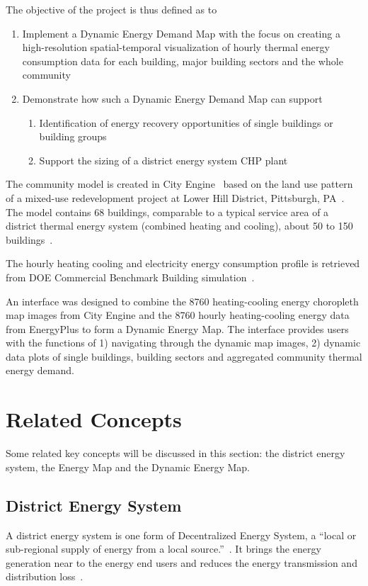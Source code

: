 The objective of the project is thus defined as to 
\begin{enumerate}
\item Implement a Dynamic Energy Demand Map with the focus on creating
  a high-resolution spatial-temporal visualization of hourly thermal
  energy consumption data for each building, major building sectors
  and the whole community
\item Demonstrate how such a Dynamic Energy Demand Map can support
  \begin{enumerate}
  \item Identification of energy recovery opportunities of single
    buildings or building groups
  \item Support the sizing of a district energy system CHP plant
  \end{enumerate}
\end{enumerate}

The community model is created in City Engine~\cite{cityEngine2015}
based on the land use pattern of a mixed-use redevelopment project at
Lower Hill District, Pittsburgh, PA~\cite{Ramesh2013}. The model
contains 68 buildings, comparable to a typical service area of a
district thermal energy system (combined heating and cooling), about
50 to 150 buildings~\cite{IDEA2005}.

The hourly heating cooling and electricity energy consumption profile
is retrieved from DOE Commercial Benchmark Building
simulation~\cite{DOE2015}. 

An interface was designed to combine the 8760 heating-cooling energy
choropleth map images from City Engine and the 8760 hourly
heating-cooling energy data from EnergyPlus to form a Dynamic Energy
Map. The interface provides users with the functions of 1) navigating
through the dynamic map images, 2) dynamic data plots of single
buildings, building sectors and aggregated community thermal energy
demand.

\section{Related Concepts}\label{concept}
Some related key concepts will be discussed in this section: the
district energy system, the Energy Map and the Dynamic Energy Map.

\subsection{District Energy System}
A district energy system is one form of Decentralized Energy System, a
``local or sub-regional supply of energy from a local
source.''~\cite{lhmreport2012}. It brings the energy generation near
to the energy end users and reduces the energy transmission and
distribution loss~\cite{decentralHeatMap2011}.

